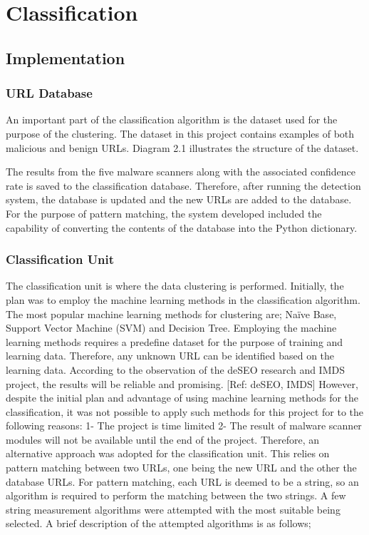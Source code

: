 \section{Classification}

\subsection{Implementation}

\subsubsection{URL Database}

An important part of the classification algorithm is the dataset used for the purpose of the clustering. The dataset in this project contains examples of both malicious and benign URLs. Diagram 2.1 illustrates the structure of the dataset.  


The results from the five malware scanners along with the associated confidence rate is saved to the classification database. Therefore, after running the detection system, the database is updated and the new URLs are added to the database. For the purpose of pattern matching, the system developed included the capability of converting the contents of the database into the Python dictionary.

\subsubsection{Classification Unit}
 
The classification unit is where the data clustering is performed. Initially, the plan was to employ the machine learning methods in the classification algorithm. The most popular machine learning methods for clustering are; Naïve Base, Support Vector Machine (SVM) and Decision Tree. Employing the machine learning methods requires a predefine dataset for the purpose of training and learning data. Therefore, any unknown URL can be identified based on the learning data. According to the observation of the deSEO research and IMDS project, the results will be reliable and promising. [Ref: deSEO, IMDS]
However, despite the initial plan and advantage of using machine learning methods for the classification, it was not possible to apply such methods for this project for to the following reasons:
1-	The project is time limited  
2-	The result of malware scanner modules will not be available until the end of the project.
Therefore, an alternative approach was adopted for the classification unit. This relies on pattern matching between two URLs, one being the new URL and the other the database URLs. For pattern matching, each URL is deemed to be a string, so an algorithm is required to perform the matching between the two strings. A few string measurement algorithms were attempted with the most suitable being selected. A brief description of the attempted algorithms is as follows;

